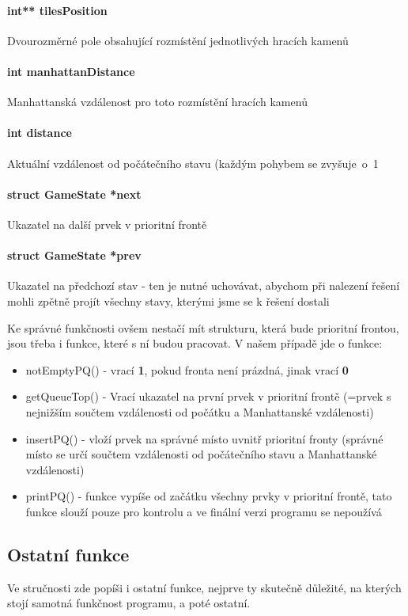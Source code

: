\documentclass[12pt,titlepage]{article}
\begin{document}
\paragraph{int** tilesPosition}
Dvourozměrné pole obsahující rozmístění jednotlivých  hracích kamenů
\paragraph{int manhattanDistance}
Manhattanská vzdálenost pro toto rozmístění hracích kamenů
\paragraph{int distance}
Aktuální vzdálenost od počátečního stavu (každým pohybem se zvyšuje~o~1
\paragraph{struct GameState *next}
Ukazatel na další prvek v prioritní frontě
\paragraph{struct GameState *prev}
Ukazatel na předchozí stav - ten je nutné uchovávat, abychom při nalezení řešení mohli zpětně projít všechny stavy, kterými jsme se k řešení dostali\newline

\par
Ke správné funkčnosti ovšem nestačí mít strukturu, která bude prioritní frontou, jsou třeba i funkce, které s ní budou pracovat. V našem případě jde o funkce:
\begin{itemize}
\item notEmptyPQ() - vrací \textbf{1}, pokud fronta není prázdná, jinak vrací \textbf{0}
\item getQueueTop() - Vrací ukazatel na první prvek v prioritní frontě (=prvek s nejnižším součtem vzdálenosti od počátku a Manhattanské vzdálenosti)
\item insertPQ() - vloží prvek na správné místo uvnitř prioritní fronty (správné místo se určí součtem vzdálenosti od počátečního stavu a Manhattanské vzdálenosti)
\item printPQ() - funkce vypíše od začátku všechny prvky v prioritní frontě, tato funkce slouží pouze pro kontrolu a ve finální verzi programu se nepoužívá
\end{itemize}

\subsection{Ostatní funkce}
Ve stručnosti zde popíši i ostatní funkce, nejprve ty skutečně důležité, na kterých stojí samotná funkčnost programu, a poté ostatní.
\end{document}

